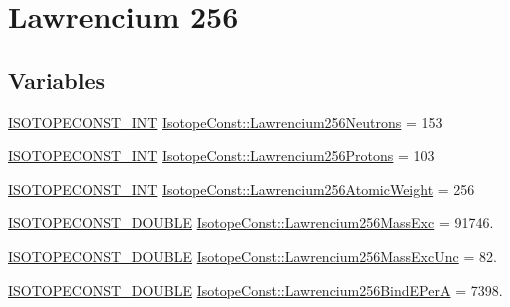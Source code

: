 \hypertarget{group___isotope_const-_lawrencium-_lr256}{}\section{Lawrencium 256}
\label{group___isotope_const-_lawrencium-_lr256}
\subsection*{Variables}
\begin{DoxyCompactItemize}
\item 
\mbox{\hyperlink{group___isotope_const-_macros_ga5f18360b3e99483a35c32d789e62621c}{I\+S\+O\+T\+O\+P\+E\+C\+O\+N\+S\+T\+\_\+\+I\+NT}} \mbox{\hyperlink{group___isotope_const-_lawrencium-_lr256_gaf7639854048fc22890f4ca2b18c29669}{Isotope\+Const\+::\+Lawrencium256\+Neutrons}} = 153
\item 
\mbox{\hyperlink{group___isotope_const-_macros_ga5f18360b3e99483a35c32d789e62621c}{I\+S\+O\+T\+O\+P\+E\+C\+O\+N\+S\+T\+\_\+\+I\+NT}} \mbox{\hyperlink{group___isotope_const-_lawrencium-_lr256_ga443296a1c9fd55eaa20303bb4f8632f7}{Isotope\+Const\+::\+Lawrencium256\+Protons}} = 103
\item 
\mbox{\hyperlink{group___isotope_const-_macros_ga5f18360b3e99483a35c32d789e62621c}{I\+S\+O\+T\+O\+P\+E\+C\+O\+N\+S\+T\+\_\+\+I\+NT}} \mbox{\hyperlink{group___isotope_const-_lawrencium-_lr256_ga0ece26d2b75bb52c193031a75b53d9b1}{Isotope\+Const\+::\+Lawrencium256\+Atomic\+Weight}} = 256
\item 
\mbox{\hyperlink{group___isotope_const-_macros_ga8f45a7272ce02c0b4c65c44636ed719a}{I\+S\+O\+T\+O\+P\+E\+C\+O\+N\+S\+T\+\_\+\+D\+O\+U\+B\+LE}} \mbox{\hyperlink{group___isotope_const-_lawrencium-_lr256_gaed538e9f60227ca905d1405dfa160ab6}{Isotope\+Const\+::\+Lawrencium256\+Mass\+Exc}} = 91746.
\item 
\mbox{\hyperlink{group___isotope_const-_macros_ga8f45a7272ce02c0b4c65c44636ed719a}{I\+S\+O\+T\+O\+P\+E\+C\+O\+N\+S\+T\+\_\+\+D\+O\+U\+B\+LE}} \mbox{\hyperlink{group___isotope_const-_lawrencium-_lr256_gad6fe59f8c7d4a4d854e884afe21ad49b}{Isotope\+Const\+::\+Lawrencium256\+Mass\+Exc\+Unc}} = 82.
\item 
\mbox{\hyperlink{group___isotope_const-_macros_ga8f45a7272ce02c0b4c65c44636ed719a}{I\+S\+O\+T\+O\+P\+E\+C\+O\+N\+S\+T\+\_\+\+D\+O\+U\+B\+LE}} \mbox{\hyperlink{group___isotope_const-_lawrencium-_lr256_ga64078b076018c5d4d9377933256d8b4f}{Isotope\+Const\+::\+Lawrencium256\+Bind\+E\+PerA}} = 7398.
\item 

\end{DoxyCompactItemize}
